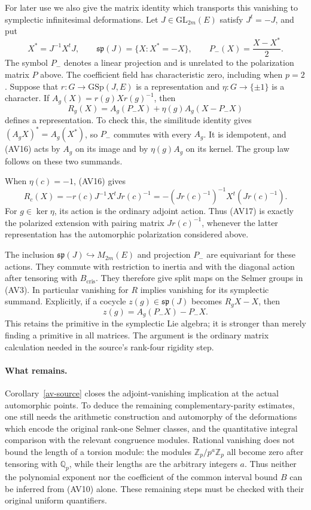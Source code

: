 For later use we also give the matrix identity which transports
this vanishing to symplectic infinitesimal deformations.
Let $J\in\mathrm{GL}_{2m}(E)$ satisfy $J^t=-J$, and put
\[
 X^*=J^{-1}X^tJ,\qquad
 \mathfrak{sp}(J)=\{X:X^*=-X\},\qquad
                        P_-(X)=\frac{X-X^*}{2}.               \tag{AV15}
\]
The symbol $P_-$ denotes a linear projection and is unrelated
to the polarization matrix $P$ above. The coefficient field
has characteristic zero, including when $p=2$.
Suppose that $r:G\longrightarrow\mathrm{GSp}(J,E)$ is a
representation and $\eta:G\longrightarrow\{\pm1\}$ is
a character. If $A_g(X)=r(g)Xr(g)^{-1}$, then
\[
 R_g(X)=A_g(P_-X)+\eta(g)A_g(X-P_-X)                            \tag{AV16}
\]
defines a representation. To check this, the similitude
identity gives $(A_gX)^*=A_g(X^*)$, so $P_-$ commutes
with every $A_g$. It is idempotent, and (AV16) acts by
$A_g$ on its image and by $\eta(g)A_g$ on its kernel.
The group law follows on these two summands.

When $\eta(c)=-1$, (AV16) gives
\[
 R_c(X)=-r(c)J^{-1}X^tJr(c)^{-1}
       =-(Jr(c)^{-1})^{-1}X^t(Jr(c)^{-1}).                      \tag{AV17}
\]
For $g\in\ker\eta$, its action is the ordinary adjoint
action. Thus (AV17) is exactly the polarized extension
with pairing matrix $Jr(c)^{-1}$, whenever the latter
representation has the automorphic polarization considered
above.

The inclusion $\mathfrak{sp}(J)\hookrightarrow M_{2m}(E)$
and projection $P_-$ are equivariant for these actions.
They commute with restriction to inertia and with the
diagonal action after tensoring with $B_{\mathrm{cris}}$.
They therefore give split maps on the Selmer groups in
(AV3). In particular vanishing for $R$ implies vanishing
for its symplectic summand. Explicitly, if a cocycle
$z(g)\in\mathfrak{sp}(J)$ becomes $R_gX-X$, then
\[
                    z(g)=A_g(P_-X)-P_-X.                       \tag{AV18}
\]
This retains the primitive in the symplectic Lie algebra;
it is stronger than merely finding a primitive in all
matrices. The argument is the ordinary matrix calculation
needed in the source's rank-four rigidity step.

\paragraph{What remains.}
Corollary~\ref{av-source} closes the adjoint-vanishing
implication at the actual automorphic points. To deduce
the remaining complementary-parity estimates, one still
needs the arithmetic construction and automorphy of the
deformations which encode the original rank-one Selmer
classes, and the quantitative integral comparison with
the relevant congruence modules. Rational vanishing does
not bound the length of a torsion module: the modules
$\mathbb Z_p/p^a\mathbb Z_p$ all become zero after
tensoring with $\mathbb Q_p$, while their lengths are
the arbitrary integers $a$. Thus neither the polynomial
exponent nor the coefficient of the common interval
bound $B$ can be inferred from (AV10) alone. These
remaining steps must be checked with their original
uniform quantifiers.


